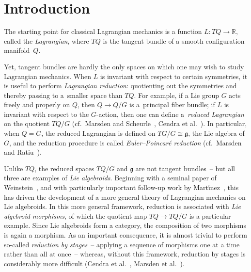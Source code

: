 \documentclass[pdftex]{sigma}
\numberwithin{equation}{section}
\begin{document}
\section{Introduction}

The starting point for classical Lagrangian mechanics is a function $ L \colon T Q \rightarrow \mathbb{R} $, called the \emph{Lagrangian}, where $ T Q $ is the tangent bundle of a smooth conf\/iguration manifold~$Q$.

Yet, tangent bundles are hardly the only spaces on which one may wish to study Lagrangian mechanics. When $L$ is invariant with respect to certain symmetries, it is useful to perform \emph{Lagrangian reduction}: quotienting out the symmetries and thereby passing to a~smaller space than $ T Q $. For example, if a Lie group $G$ acts freely and properly on $Q$, then $ Q \rightarrow Q / G $ is a~principal f\/iber bundle; if $L$ is invariant with respect to the $G$-action, then one can def\/ine a~\emph{reduced Lagrangian} on the quotient $ T Q / G $ (cf.\ Marsden and Scheurle~\cite{MaSc1993b}, Cendra et al.~\cite{CeMaRa2001}). In particular, when $ Q = G $, the reduced Lagrangian is def\/ined on $ T G / G \cong \mathfrak{g} $, the Lie algebra of~$G$, and the reduction procedure is called \emph{Euler--Poincar\'e reduction} (cf.\ Marsden and Ratiu~\cite[Chapter~13]{MaRa1999}).

Unlike $ T Q $, the reduced spaces $ T Q / G $ and $ \mathfrak{g} $ are not tangent bundles~-- but all three are examples of \emph{Lie algebroids}. Beginning with a seminal paper of Weinstein~\cite{Weinstein1996}, and with particularly important follow-up work by Mart\'{\i}nez~\cite{Martinez2001,Martinez2007,Martinez2008}, this has driven the development of a more general theory of Lagrangian mechanics on Lie
algebroids. In this more general framework, reduction is associated with \emph{Lie algebroid morphisms}, of which the quotient map $ T Q \rightarrow T Q / G $ is a particular example. Since Lie algebroids form a category, the composition of two morphisms is again a morphism. As an important consequence, it is almost trivial to perform so-called \emph{reduction by stages}~-- applying a sequence of morphisms one at a time rather than all at once~-- whereas, without this framework, reduction by stages is considerably more dif\/f\/icult (Cendra et al.~\cite{CeMaRa2001}, Marsden et al.~\cite{MaMiOrPeRa2007}).
\end{document}
